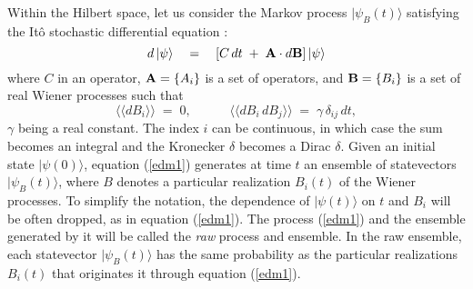 \documentclass[10pt,a4paper]{article}
\newcommand{\llangle}{\langle\!\langle}
\newcommand{\rrangle}{\rangle\!\rangle}
\begin{document}
Within the Hilbert space, let us consider the Markov process
$|\psi_{B}(t)\rangle$ satisfying the It\^o stochastic differential
equation \cite{arn}:
\begin{equation} \label{edm1}
d\,|\psi\rangle \quad = \quad \left[C\, dt \; + \; {\bf A}\cdot
d{\bf B} \right]|\psi\rangle
\end{equation}
where $C$ in an operator, ${\bf A} = \{A_{i}\}$ is a set of
operators, and ${\bf B} = \{B_{i}\}$ is a set of real Wiener
processes such that
\begin{equation}
\llangle dB_{i} \rrangle \; = \; 0, \qquad \quad \llangle dB_{i}\,
dB_{j} \rrangle \; = \; \gamma\,\delta_{ij}\,dt,
\end{equation}
$\gamma$ being a real constant. The index $i$ can be continuous,
in which case the sum becomes an integral and the Kronecker
$\delta$ becomes a Dirac $\delta$. Given an initial state
$|\psi(0)\rangle$, equation (\ref{edm1}) generates at time $t$ an
ensemble of statevectors $|\psi_{B}(t)\rangle$, where $B$ denotes
a particular realization $B_{i}(t)$ of the Wiener processes. To
simplify the notation, the dependence of $|\psi(t)\rangle$ on $t$
and $B_{i}$ will be often dropped, as in equation (\ref{edm1}).
The process (\ref{edm1}) and the ensemble generated by it will be
called the {\it raw} process and ensemble. In the raw ensemble,
each statevector $|\psi_{B}(t)\rangle$ has the same probability as
the particular realizations $B_{i}(t)$ that originates it through
equation (\ref{edm1}).
\end{document}
